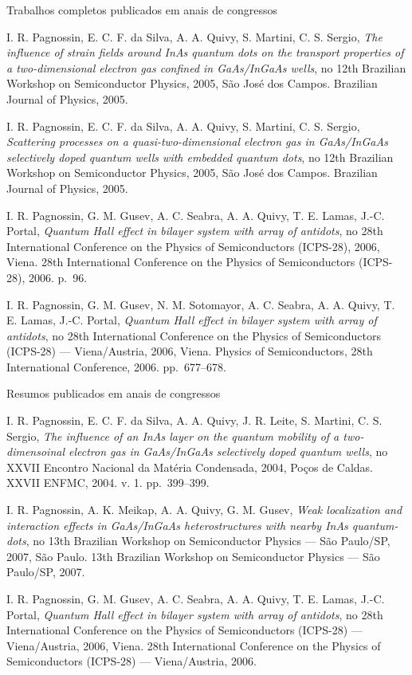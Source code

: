 \begin{compactitem}
	\item Trabalhos completos publicados em anais de congressos
	\begin{compactitem}
		\item I. R. Pagnossin, E. C. F. da Silva, A. A. Quivy, S. Martini, C. S. Sergio, \textsl{The influence of strain fields around InAs quantum dots on the transport properties of a two-dimensional electron gas confined in GaAs/InGaAs wells}, no 12th Brazilian Workshop on Semiconductor Physics, 2005, São José dos Campos. Brazilian Journal of Physics, 2005.
		\item I. R. Pagnossin, E. C. F. da Silva, A. A. Quivy, S. Martini, C. S. Sergio, \textsl{Scattering processes on a quasi-two-dimensional electron gas in GaAs/InGaAs selectively doped quantum wells with embedded quantum dots}, no 12th Brazilian Workshop on Semiconductor Physics, 2005, São José dos Campos. Brazilian Journal of Physics, 2005.
		\item I. R. Pagnossin, G. M. Gusev, A. C. Seabra, A. A. Quivy, T. E. Lamas, J.-C. Portal, \textsl{Quantum Hall effect in bilayer system with array of antidots}, no 28th International Conference on the Physics of Semiconductors (ICPS-28), 2006, Viena. 28th International Conference on the Physics of Semiconductors (ICPS-28), 2006. p.~96.
		\item I. R. Pagnossin, G. M. Gusev, N. M. Sotomayor, A. C. Seabra, A. A. Quivy, T. E. Lamas, J.-C. Portal, \textsl{Quantum Hall effect in bilayer system with array of antidots}, no 28th International Conference on the Physics of Semiconductors (ICPS-28) --- Viena/Austria, 2006, Viena. Physics of Semiconductors, 28th International Conference, 2006. pp.~677--678.
	\end{compactitem}
	
	\item Resumos publicados em anais de congressos
	\begin{compactitem}
		\item I. R. Pagnossin, E. C. F. da Silva, A. A. Quivy, J. R. Leite, S. Martini, C. S. Sergio, \textsl{The influence of an InAs layer on the quantum mobility of a two-dimensoinal electron gas in GaAs/InGaAs selectively doped quantum wells}, no XXVII Encontro Nacional da Matéria Condensada, 2004, Poços de Caldas. XXVII ENFMC, 2004. v. 1. pp.~399--399.
		\item I. R. Pagnossin, A. K. Meikap, A. A. Quivy, G. M. Gusev, \textsl{Weak localization and interaction effects in GaAs/InGaAs heterostructures with nearby InAs quantum-dots}, no 13th Brazilian Workshop on Semiconductor Physics --- São Paulo/SP, 2007, São Paulo. 13th Brazilian Workshop on Semiconductor Physics --- São Paulo/SP, 2007.
		\item I. R. Pagnossin, G. M. Gusev, A. C. Seabra, A. A. Quivy, T. E. Lamas, J.-C. Portal, \textsl{Quantum Hall effect in bilayer system with array of antidots}, no 28th International Conference on the Physics of Semiconductors (ICPS-28) --- Viena/Austria, 2006, Viena. 28th International Conference on the Physics of Semiconductors (ICPS-28) --- Viena/Austria, 2006.	
	\end{compactitem}
	

\end{compactitem}
